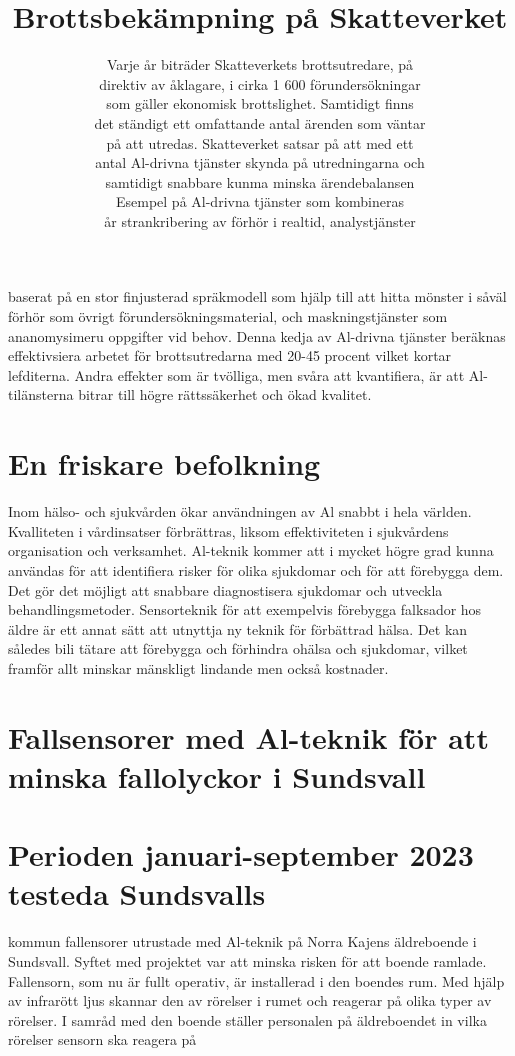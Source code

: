 {{{{{{{{{{{{{{{{{\title{
Brottsbekämpning på Skatteverket
}
\author{
Varje år biträder Skatteverkets brottsutredare, på \\ direktiv av åklagare, i cirka 1 600 förundersökningar \\ som gäller ekonomisk brottslighet. Samtidigt finns \\ det ständigt ett omfattande antal ärenden som väntar \\ på att utredas. Skatteverket satsar på att med ett \\ antal Al-drivna tjänster skynda på utredningarna och \\ samtidigt snabbare kunma minska ärendebalansen \\ Esempel på Al-drivna tjänster som kombineras \\ år strankribering av förhör i realtid, analystjänster
}
baserat på en stor finjusterad spräkmodell som hjälp till att hitta mönster i såväl förhör som övrigt förundersökningsmaterial, och maskningstjänster som ananomysimeru oppgifter vid behov. Denna kedja av Al-drivna tjänster beräknas effektivsiera arbetet för brottsutredarna med 20-45 procent vilket kortar lefditerna. Andra effekter som är tvölliga, men svåra att kvantifiera, är att Al-tilänsterna bitrar till högre rättssäkerhet och ökad kvalitet.
\section*{En friskare befolkning}
Inom hälso- och sjukvården ökar användningen av Al snabbt i hela världen. Kvalliteten i vårdinsatser förbrättras, liksom effektiviteten i sjukvårdens organisation och verksamhet. Al-teknik kommer att i mycket högre grad kunna användas för att identifiera risker för olika sjukdomar och för att förebygga dem. Det gör
det möjligt att snabbare diagnostisera sjukdomar och utveckla behandlingsmetoder. Sensorteknik för att exempelvis förebygga falksador hos äldre är ett annat sätt att utnyttja ny teknik för förbättrad hälsa. Det kan således bili tätare att förebygga och förhindra ohälsa och sjukdomar, vilket framför allt minskar mänskligt lindande men också kostnader.
\section*{Fallsensorer med Al-teknik för att minska fallolyckor i Sundsvall}
\section*{Perioden januari-september 2023 testeda Sundsvalls} kommun fallensorer utrustade med Al-teknik på
Norra Kajens äldreboende i Sundsvall. Syftet med projektet var att minska risken för att boende ramlade. Fallensorn, som nu är fullt operativ, är installerad i den boendes rum. Med hjälp av infrarött ljus skannar den av rörelser i rumet och reagerar på olika typer av rörelser. I samråd med den boende ställer personalen på äldreboendet in vilka rörelser sensorn ska reagera på
}}}}}}}}}}}}}}}}}
